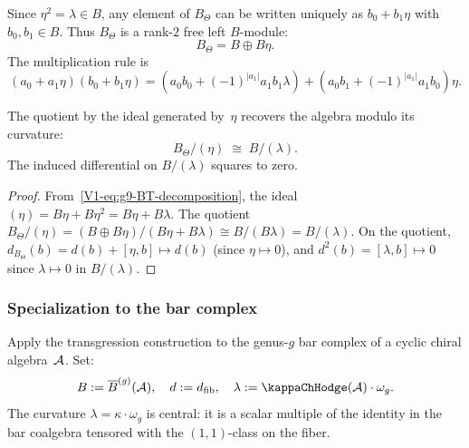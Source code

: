 \begin{remark}
Since $\eta^2 = \lambda \in B$, any element of $B_\Theta$ can be
written uniquely as $b_0 + b_1 \eta$ with $b_0, b_1 \in B$.
Thus $B_\Theta$ is a rank-$2$ free left $B$-module:
\begin{equation}%
B_\Theta = B \oplus B\eta.
\end{equation}
The multiplication rule is
\begin{equation}%
(a_0 + a_1\eta)(b_0 + b_1\eta)
= (a_0 b_0 + (-1)^{|a_1|}a_1 b_1 \lambda)
 + (a_0 b_1 + (-1)^{|a_1|}a_1 b_0)\eta.
\end{equation}
\end{remark}

\begin{proposition}
The quotient by the ideal generated by~$\eta$ recovers the algebra
modulo its curvature:
\begin{equation}%
B_\Theta / (\eta) \;\cong\; B / (\lambda).
\end{equation}
The induced differential on $B/(\lambda)$ squares to zero.
\end{proposition}

\begin{proof}
From~\eqref{V1-eq:g9-BT-decomposition}, the ideal $(\eta) = B\eta + B\eta^2
= B\eta + B\lambda$. The quotient
$B_\Theta/(\eta) = (B \oplus B\eta)/(B\eta + B\lambda)
\cong B/(B\lambda) = B/(\lambda)$.
On the quotient, $d_{B_\Theta}(b) = d(b) + [\eta, b] \mapsto d(b)$
(since $\eta \mapsto 0$), and $d^2(b) = [\lambda, b] \mapsto 0$ since
$\lambda \mapsto 0$ in $B/(\lambda)$.
\end{proof}

\subsubsection{Specialization to the bar complex}

Apply the transgression construction to the genus-$g$ bar complex of a
cyclic chiral algebra~$\mathcal{A}$. Set:
\begin{equation}%
B := \barB^{(g)}(\cA),
\quad
d := \dfib,
\quad
\lambda := \kappaChHodge(\cA) \cdot \omega_g.
\end{equation}
The curvature $\lambda = \kappa \cdot \omega_g$ is central: it is a scalar
multiple of the identity in the bar coalgebra tensored with the
$(1,1)$-class on the fiber.

